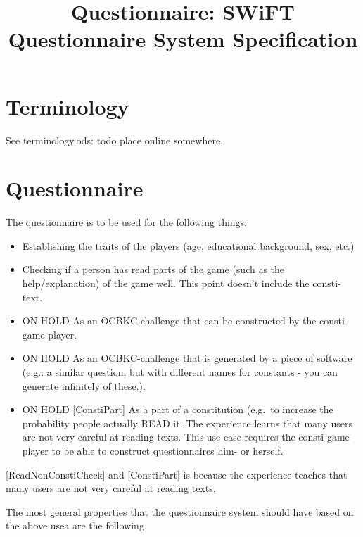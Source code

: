 \documentclass{article}
\begin{document}
\title{Questionnaire: SWiFT Questionnaire System Specification}

\maketitle

\section{Terminology}

See terminology.ods: todo place online somewhere.

\section{Questionnaire}

The questionnaire is to be used for the following things:

\begin{itemize}
   \item [TraitsPlayer] Establishing the traits of the players (age, educational background, sex, etc.)
   \item [ReadNonConstiCheck] Checking if a person has read parts of the game (such as the help/explanation) of the game well. This point doesn't include the consti-text.
   \item ON HOLD As an OCBKC-challenge that can be constructed by the consti-game player.
   \item ON HOLD As an OCBKC-challenge that is generated by a piece of software (e.g.: a similar question, but with different names for constants - you can generate infinitely of these.).
   \item ON HOLD [ConstiPart] As a part of a constitution (e.g.~to increase the probability people actually READ it. The experience learns that many users are not very careful at reading texts. This use case requires the consti game player to be able to construct questionnaires him- or herself.
\end{itemize}

[ReadNonConstiCheck] and [ConstiPart] is because the experience teaches that many users are not very careful at reading texts.

The most general properties that the questionnaire system should have based on the above usea are the following.

\end{document}
